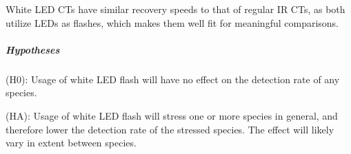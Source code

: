 White LED CTs have similar recovery speeds to that of regular IR CTs, as both utilize LEDs as flashes, which makes them well fit for meaningful comparisons.

\subparagraph{Hypotheses} 

(H0): Usage of white LED flash will have no effect on the detection rate of any species.

(HA): Usage of white LED flash will stress one or more species in general, and therefore lower the detection rate of the stressed species. The effect will likely vary in extent between species. %





